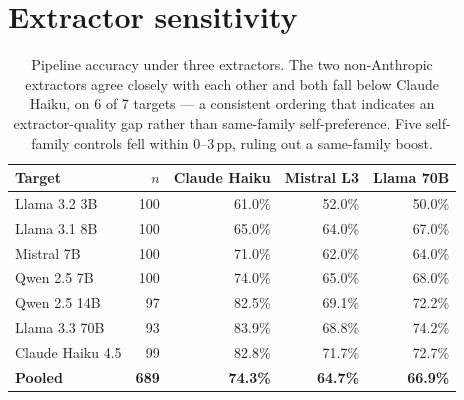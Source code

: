 \section{Extractor sensitivity}
\label{app:crossfam}

\begin{table}[h]
\centering
\small
\caption{Pipeline accuracy under three extractors. The two non-Anthropic extractors agree closely with each other and both fall below Claude Haiku, on 6 of 7 targets --- a consistent ordering that indicates an extractor-quality gap rather than same-family self-preference. Five self-family controls fell within 0--3\,pp, ruling out a same-family boost.}
\label{tab:crossfam}
\begin{tabular}{lrrrr}
\toprule
\textbf{Target} & $n$ & \textbf{Claude Haiku} & \textbf{Mistral L3} & \textbf{Llama 70B} \\
\midrule
Llama 3.2 3B     & 100 & 61.0\% & 52.0\% & 50.0\% \\
Llama 3.1 8B     & 100 & 65.0\% & 64.0\% & 67.0\% \\
Mistral 7B       & 100 & 71.0\% & 62.0\% & 64.0\% \\
Qwen 2.5 7B      & 100 & 74.0\% & 65.0\% & 68.0\% \\
Qwen 2.5 14B     & \phantom{0}97 & 82.5\% & 69.1\% & 72.2\% \\
Llama 3.3 70B    & \phantom{0}93 & 83.9\% & 68.8\% & 74.2\% \\
Claude Haiku 4.5 & \phantom{0}99 & 82.8\% & 71.7\% & 72.7\% \\
\midrule
\textbf{Pooled}  & \textbf{689} & \textbf{74.3\%} & \textbf{64.7\%} & \textbf{66.9\%} \\
\bottomrule
\end{tabular}
\end{table}

